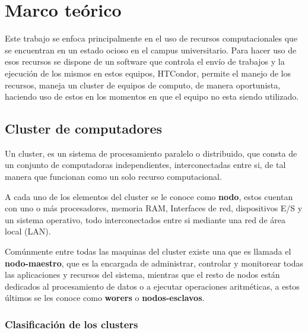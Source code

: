 
\chapter{Marco teórico} %

\label{Chapter2} %

Este trabajo se enfoca principalmente en el uso de recursos computacionales que se encuentran en un estado ocioso en el campus universitario. Para hacer uso de esos recursos se dispone de un software que controla el envío de trabajos y la ejecución de los mismos en estos equipos, HTCondor, permite el manejo de los recursos, maneja un cluster de equipos de computo, de manera oportunista, haciendo uso de estos en los momentos en que el equipo no esta siendo utilizado.

\section{Cluster de computadores}
Un cluster, es un sistema de procesamiento paralelo o distribuido, que consta de un conjunto de computadoras independientes, interconectadas entre si, de tal manera que funcionan como un solo recurso computacional.

A cada uno de los elementos del cluster se le conoce como \textbf{nodo}, estos cuentan con uno o más procesadores, memoria RAM, Interfaces de red, dispositivos E/S y un sistema operativo, todo interconectados entre si mediante una red de área local (LAN).

Comúnmente entre todas las maquinas del cluster existe una que es llamada el \textbf{nodo-maestro}, que es la encargada de administrar, controlar y monitorear todas las aplicaciones y recursos del sistema, mientras que el resto de nodos están dedicados al procesamiento de datos o a ejecutar operaciones aritméticas, a estos últimos se les conoce como \textbf{worers} o \textbf{nodos-esclavos}.

\subsection*{Clasificación de los clusters}

